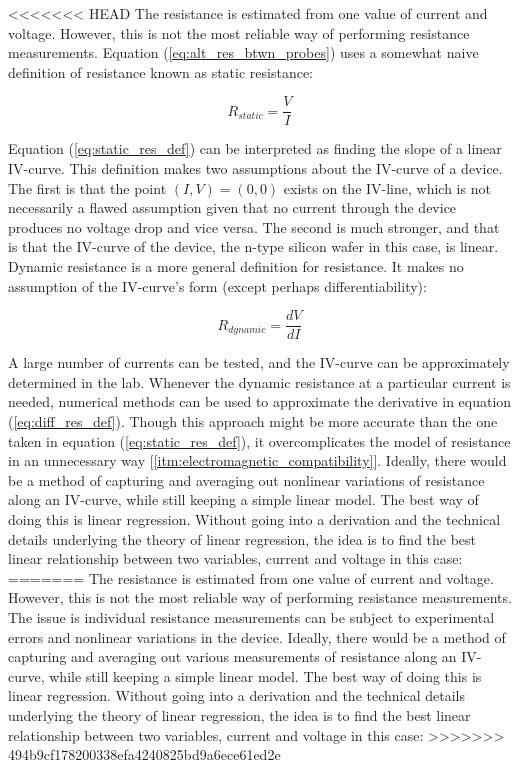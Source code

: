 \documentclass{article}
\begin{document}

<<<<<<< HEAD
The resistance is estimated from one value of current and voltage. However, this is not the most reliable way of performing resistance measurements.
Equation (\ref{eq:alt_res_btwn_probes}) uses a somewhat naive definition of resistance known as static resistance:

\begin{equation}
\label{eq:static_res_def}
R_{static} = \frac{V}{I}
\end{equation}

Equation (\ref{eq:static_res_def}) can be interpreted as finding the slope of a linear IV-curve. This definition makes two assumptions about the IV-curve of a device. The first is that the point $(I,V) = (0,0)$ exists on the IV-line, which is not necessarily a flawed assumption given that no current through the device produces no voltage drop and vice versa. The second is much stronger, and that is that the IV-curve of the device, the n-type silicon wafer in this case, is linear.
Dynamic resistance is a more general definition for resistance. It makes no assumption of the IV-curve's form (except perhaps differentiability):

\begin{equation}
\label{eq:diff_res_def}
R_{dynamic} = \frac{dV}{dI}
\end{equation}

A large number of currents can be tested, and the IV-curve can be approximately determined in the lab. Whenever the dynamic resistance at a particular current is needed, numerical methods can be used to approximate the derivative in equation (\ref{eq:diff_res_def}). Though this approach might be more accurate than the one taken in equation (\ref{eq:static_res_def}), it overcomplicates the model of resistance in an unnecessary way [\ref{itm:electromagnetic_compatibility}].
Ideally, there would be a method of capturing and averaging out nonlinear variations of resistance along an IV-curve, while still keeping a simple linear model. The best way of doing this is linear regression. Without going into a derivation and the technical details underlying the theory of linear regression, the idea is to find the best linear relationship between two variables, current and voltage in this case:
=======
The resistance is estimated from one value of current and voltage. However, this is not the most reliable way of performing resistance measurements. The issue is individual resistance measurements can be subject to experimental errors and nonlinear variations in the device.
Ideally, there would be a method of capturing and averaging out various measurements of resistance along an IV-curve, while still keeping a simple linear model. The best way of doing this is linear regression. Without going into a derivation and the technical details underlying the theory of linear regression, the idea is to find the best linear relationship between two variables, current and voltage in this case:
>>>>>>> 494b9cf178200338efa4240825bd9a6ece61ed2e
\end{document}
